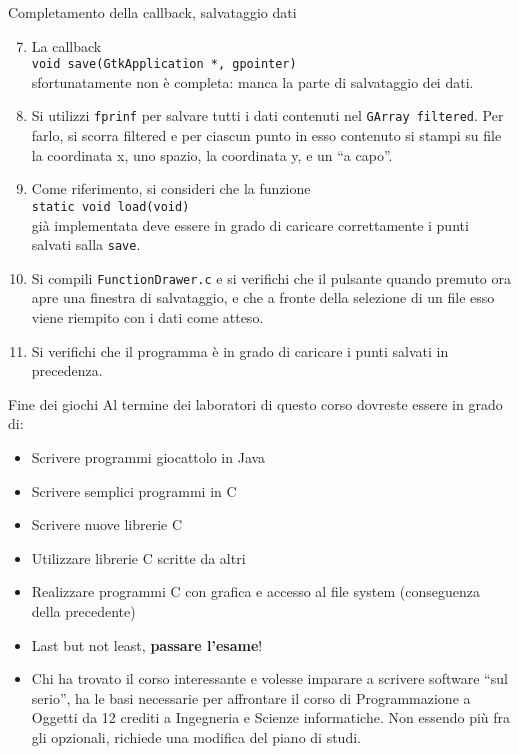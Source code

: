 \documentclass{beamer}
\begin{document}
\begin{frame}[fragile]{Completamento della callback, salvataggio dati}
\begin{enumerate}
\setcounter{enumi}{6}
 \item La callback \\ \texttt{void save(GtkApplication *, gpointer)} \\ sfortunatamente non è completa: manca la parte di salvataggio dei dati.
 \item Si utilizzi \texttt{fprinf} per salvare tutti i dati contenuti nel \texttt{GArray filtered}. Per farlo, si scorra filtered e per ciascun punto in esso contenuto si stampi su file la coordinata x, uno spazio, la coordinata y, e un ``a capo''.
 \item Come riferimento, si consideri che la funzione \\ \texttt{static void load(void)} \\ già implementata deve essere in grado di caricare correttamente i punti salvati salla \texttt{save}.
 \item Si compili \texttt{FunctionDrawer.c} e si verifichi che il pulsante quando premuto ora apre una finestra di salvataggio, e che a fronte della selezione di un file esso viene riempito con i dati come atteso.
 \item Si verifichi che il programma è in grado di caricare i punti salvati in precedenza.
\end{enumerate}
\end{frame}

\begin{frame}[fragile]{Fine dei giochi}
Al termine dei laboratori di questo corso dovreste essere in grado di:
\begin{itemize}
 \item Scrivere programmi giocattolo in Java
 \item Scrivere semplici programmi in C
 \item Scrivere nuove librerie C
 \item Utilizzare librerie C scritte da altri
 \item Realizzare programmi C con grafica e accesso al file system (conseguenza della precedente)
 \item Last but not least, \textbf{passare l'esame}!
 \item Chi ha trovato il corso interessante e volesse imparare a scrivere software ``sul serio'', ha le basi necessarie per affrontare il corso di Programmazione a Oggetti da 12 crediti a Ingegneria e Scienze informatiche. Non essendo più fra gli opzionali, richiede una modifica del piano di studi.
\end{itemize}
\end{frame}
\end{document}
